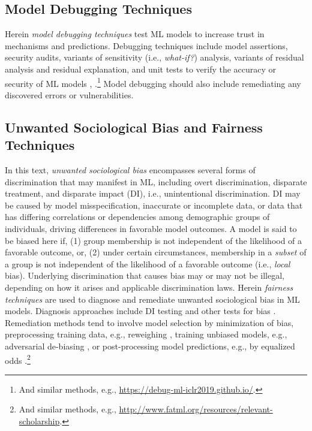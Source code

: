 \documentclass{article}
\begin{document}
\subsection{Model Debugging Techniques}

Herein \textit{model debugging techniques} test ML models to increase trust in mechanisms and predictions. Debugging techniques include model assertions, security audits, variants of sensitivity (i.e., \textit{what-if?}) analysis, variants of residual analysis and residual explanation, and unit tests to verify the accuracy or security of ML models \cite{modeltracker}, \cite{kangdebugging}.\footnote{\scriptsize{And similar methods, e.g., \url{https://debug-ml-iclr2019.github.io/}.}} Model debugging should also include remediating any discovered errors or vulnerabilities.

\subsection{Unwanted Sociological Bias and Fairness Techniques}

In this text, \textit{unwanted sociological bias} encompasses several forms of discrimination that may manifest in ML, including overt discrimination, disparate treatment, and disparate impact (DI), i.e., unintentional discrimination. DI may be caused by model misspecification, inaccurate or incomplete data, or data that has differing correlations or dependencies among demographic groups of individuals, driving differences in favorable model outcomes. A model is said to be biased here if, (1) group membership is not independent of the likelihood of a favorable outcome, or, (2) under certain circumstances, membership in a \textit{subset} of a group is not independent of the likelihood of a favorable outcome (i.e., \textit{local} bias). Underlying discrimination that causes bias may or may not be illegal, depending on how it arises and applicable discrimination laws. Herein \textit{fairness techniques} are used to diagnose and remediate unwanted sociological bias in ML models. Diagnosis approaches include DI testing and other tests for bias \cite{feldman2015certifying}. Remediation methods tend to involve model selection by minimization of bias, preprocessing training data, e.g., reweighing \cite{kamiran2012data}, training unbiased models, e.g., adversarial de-biasing \cite{zhang2018mitigating}, or post-processing model predictions, e.g., by equalized odds \cite{hardt2016equality}.\footnote{\scriptsize{And similar methods, e.g., \url{http://www.fatml.org/resources/relevant-scholarship}.}} 
\end{document}
